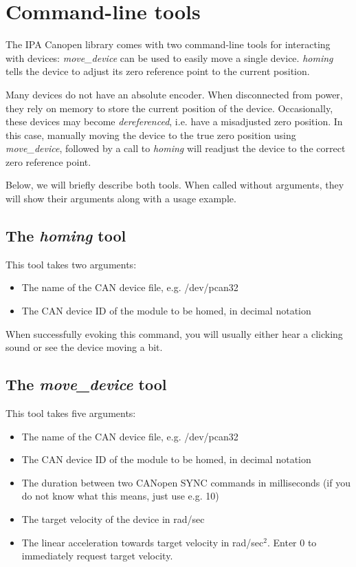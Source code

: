 \chapter{Command-line tools}
\label{chap:tools}

The IPA Canopen library comes with two command-line tools for interacting with devices: {\em move\_device} can be used to easily move a single device. {\em homing} tells the device to adjust its zero reference point to the current position.

Many devices do not have an absolute encoder. When disconnected from power, they rely on memory to store the current position of the device. Occasionally, these devices may become {\em dereferenced}, i.e. have a misadjusted zero position. In this case, manually moving the device to the true zero position using {\em move\_device}, followed by a call to {\em homing} will readjust the device to the correct zero reference point.

Below, we will briefly describe both tools. When called without arguments, they will show their arguments along with a usage example.

\section{The {\em homing} tool}

This tool takes two arguments:

\begin{itemize}
\item The name of the CAN device file, e.g. /dev/pcan32
\item The CAN device ID of the module to be homed, in decimal notation
\end{itemize}

When successfully evoking this command, you will usually either hear a clicking sound or see the device moving a bit.

\section{The {\em move\_device} tool}

This tool takes five arguments:

\begin{itemize}
\item The name of the CAN device file, e.g. /dev/pcan32
\item The CAN device ID of the module to be homed, in decimal notation
\item The duration between two CANopen SYNC commands in milliseconds (if you do not know what this means, just use e.g. 10)
\item The target velocity of the device in rad/sec
\item The linear acceleration towards target velocity in rad/sec$^2$. Enter $0$ to immediately request target velocity.
\end{itemize}

